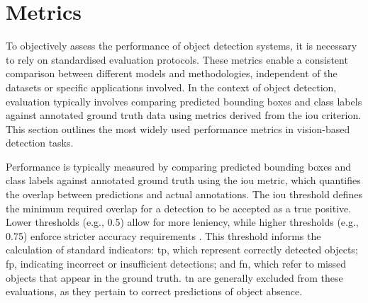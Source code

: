 \section{Metrics}
\label{sec:4_metrics}

To objectively assess the performance of object detection systems, it is necessary to rely on standardised evaluation protocols. These metrics enable a consistent comparison between different models and methodologies, independent of the datasets or specific applications involved. In the context of object detection, evaluation typically involves comparing predicted bounding boxes and class labels against annotated ground truth data using metrics derived from the \gls{iou} criterion. This section outlines the most widely used performance metrics in vision-based detection tasks.

Performance is typically measured by comparing predicted bounding boxes and class labels against annotated ground truth using the \gls{iou} metric, which quantifies the overlap between predictions and actual annotations. The \gls{iou} threshold defines the minimum required overlap for a detection to be accepted as a true positive. Lower thresholds (e.g., 0.5) allow for more leniency, while higher thresholds (e.g., 0.75) enforce stricter accuracy requirements \cite{coco}. This threshold informs the calculation of standard indicators: \gls{tp}, which represent correctly detected objects; \gls{fp}, indicating incorrect or insufficient detections; and \gls{fn}, which refer to missed objects that appear in the ground truth. \gls{tn} are generally excluded from these evaluations, as they pertain to correct predictions of object absence.


